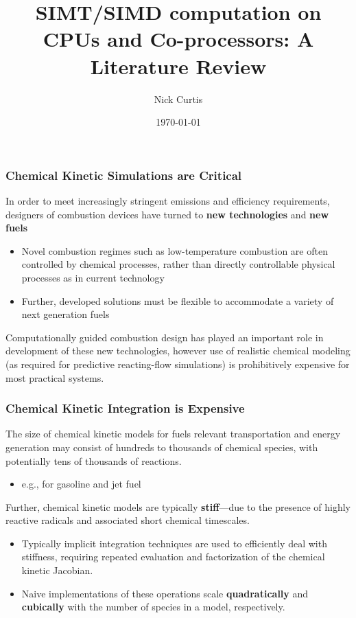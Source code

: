 \documentclass{beamer}
\title{SIMT\slash SIMD computation on CPUs and Co-processors: A Literature Review}
\author{Nick Curtis}
\institute{University of Connecticut}
\date{\today}
\begin{document}
\maketitle

\begin{frame}
\frametitle{Chemical Kinetic Simulations are \textbf{Critical}}
In order to meet increasingly stringent emissions and efficiency requirements, designers of combustion devices have turned to \textbf{new technologies} and \textbf{new fuels}
\begin{itemize}
 \item Novel combustion regimes such as low-temperature combustion are often controlled by chemical processes, rather than directly controllable physical processes as in current technology
 \item Further, developed solutions must be flexible to accommodate a variety of next generation fuels
\end{itemize}
Computationally guided combustion design has played an important role in development of these new technologies, however use of realistic chemical modeling (as required for predictive reacting-flow simulations) is prohibitively expensive for most practical systems. 
\end{frame}

\begin{frame}
 \frametitle{Chemical Kinetic Integration is \textbf{Expensive}}
 The size of chemical kinetic models for fuels relevant transportation and energy generation may consist of hundreds to thousands of chemical species, with potentially tens of thousands of reactions.
 \begin{itemize}
  \item e.g., for gasoline  and jet fuel
 \end{itemize}
 Further, chemical kinetic models are typically \textbf{stiff}---due to the presence of highly reactive radicals and associated short chemical timescales.
 \begin{itemize}
  \item Typically implicit integration techniques are used to efficiently deal with stiffness, requiring repeated evaluation and factorization of the chemical kinetic Jacobian.
  \item Naive implementations of these operations scale \textbf{quadratically} and \textbf{cubically} with the number of species in a model, respectively.
 \end{itemize}
\end{frame}
\end{document}
